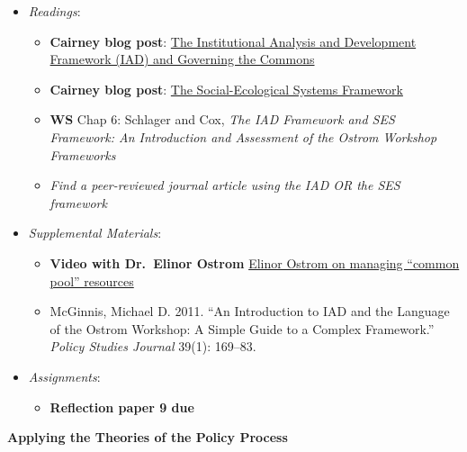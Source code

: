 \begin{itemize}

\item
  \emph{Readings}:

  \begin{itemize}
  
  \item
    \textbf{Cairney blog post}:
    \href{https://paulcairney.wordpress.com/2019/02/03/policy-concepts-in-1000-words-the-institutional-analysis-and-development-framework-iad-and-governing-the-commons/}{The
    Institutional Analysis and Development Framework (IAD) and Governing
    the Commons}
  \item
    \textbf{Cairney blog post}:
    \href{https://paulcairney.wordpress.com/2019/02/03/policy-in-500-words-the-social-ecological-systems-framework/}{The
    Social-Ecological Systems Framework}
  \item
    \textbf{WS} Chap 6: Schlager and Cox, \emph{The IAD Framework and
    SES Framework: An Introduction and Assessment of the Ostrom Workshop
    Frameworks}
  \item
    \emph{Find a peer-reviewed journal article using the IAD OR the SES
    framework}
  \end{itemize}
\item
  \emph{Supplemental Materials}:

  \begin{itemize}
  
  \item
    \faYoutube \hspace{0.005in} \textbf{Video with Dr.~Elinor Ostrom}
    \href{https://www.youtube.com/watch?v=D1xwV2UDPAg}{Elinor Ostrom on
    managing ``common pool'' resources}
  \item
    McGinnis, Michael D. 2011. ``An Introduction to IAD and the Language
    of the Ostrom Workshop: A Simple Guide to a Complex Framework.''
    \emph{Policy Studies Journal} 39(1): 169--83.
  \end{itemize}
\item
  \emph{Assignments}:

  \begin{itemize}
  
  \item
    \textbf{‌Reflection paper 9 due}
  \end{itemize}
\end{itemize}

\week \textbf{Applying the Theories of the Policy Process}

